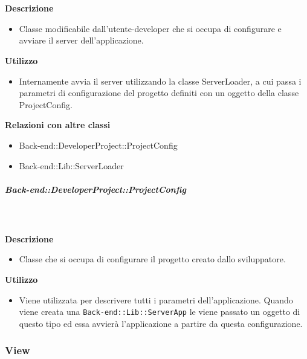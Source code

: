         \textbf{\\ \\ Descrizione} 
          \begin{itemize}
            \item[] Classe modificabile dall'utente-developer che si occupa di configurare e avviare il server dell'applicazione.
          \end{itemize}      
        \textbf{Utilizzo}  
          \begin{itemize}
            \item[] Internamente avvia il server utilizzando la classe ServerLoader, a cui passa i parametri di configurazione del progetto definiti con un oggetto della classe ProjectConfig.
          \end{itemize}
          \textbf{Relazioni con altre classi}
          \begin{itemize}
              \item{Back-end::DeveloperProject::ProjectConfig}
              \item{Back-end::Lib::ServerLoader}
          \end{itemize}
      \subparagraph{Back-end::DeveloperProject::ProjectConfig}
        
        \textbf{\\ \\ Descrizione} 
          \begin{itemize}
            \item[] Classe che si occupa di configurare il progetto creato dallo sviluppatore.
          \end{itemize}      
        \textbf{Utilizzo}  
          \begin{itemize}
            \item[] Viene utilizzata per descrivere tutti i parametri dell'applicazione. Quando viene creata una \texttt{Back-end::Lib::ServerApp} le viene passato un oggetto di questo tipo ed essa avvierà l'applicazione a partire da questa configurazione.
          \end{itemize}
  \subsubsection{View}
